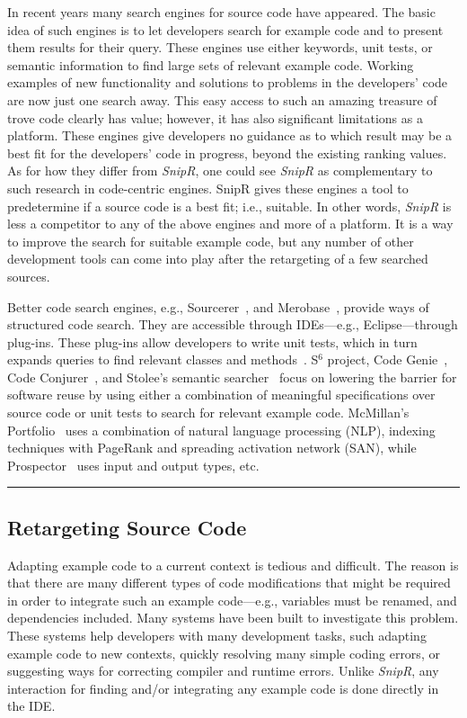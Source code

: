 In recent years many search engines for source code have appeared. The basic idea of such engines is to let developers search for example code and to present them results for their query. These engines use either keywords, unit tests, or semantic information to find large sets of relevant example code. Working examples of new functionality and solutions to problems in the developers’ code are now just one search away. This easy access to such an amazing treasure of trove code clearly has value; however, it has also significant limitations as a platform. These engines give developers no guidance as to which result may be a best fit for the developers' code in progress, beyond the existing ranking values. As for how they differ from \emph{SnipR}, one could see \emph{SnipR} as complementary to such research in code-centric engines. SnipR gives these engines a tool to predetermine if a source code is a best fit; i.e., suitable. In other words, \emph{SnipR} is less a competitor to any of the above engines and more of a platform. It is a way to improve the search for suitable example code, but any number of other development tools can come into play after the retargeting of a few searched sources. 
         
Better code search engines, e.g., Sourcerer~\cite{Bajracharya:2006vn}, and Merobase~\cite{Hummel:eq}, provide ways of structured code search. They are accessible through IDEs---e.g., Eclipse---through plug-ins. These plug-ins allow developers to write unit tests, which in turn expands queries to find relevant classes and methods~\cite{Hummel:eq}. S$^{6}$ project\cite{Reiss:2009fu}, Code Genie~\cite{LazzariniLemos:2007jh}, Code Conjurer~\cite{Hummel:eq}, and Stolee's semantic searcher~\cite{Stolee:2012wp} focus on lowering the barrier for software reuse by using either a combination of meaningful specifications over source code or unit tests to search for relevant example code. McMillan's Portfolio~\cite{McMillan:2011cm, McMillan:2011wq} uses a combination of natural language processing (NLP), indexing techniques with PageRank and spreading activation network (SAN), while Prospector~\cite{Mandelin:2005uj} uses input and output types, etc.

\fancybreak{\pfbreakdisplay}

\subsection{Retargeting Source Code}
\label{sec:retargetingcode}

Adapting example code to a current context is tedious and difficult. The reason is that there are many different types of code modifications that might be required in order to integrate such an example code---e.g., variables must be renamed, and dependencies included. Many systems have been built to investigate this problem. These systems help developers with many development tasks, such adapting example code to new contexts, quickly resolving many simple coding errors, or suggesting ways for correcting compiler and runtime errors. Unlike \emph{SnipR}, any interaction for finding and/or integrating any example code is done directly in the IDE.  

